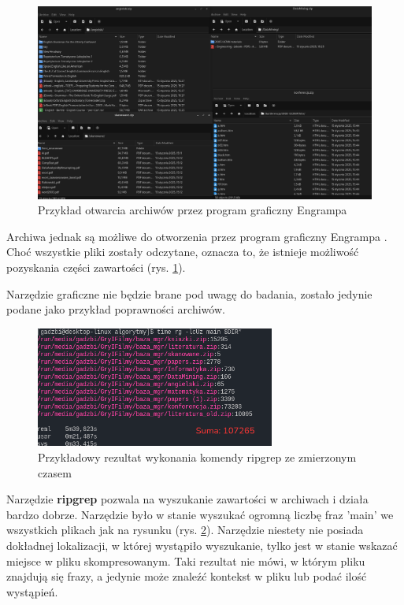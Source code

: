 \begin{figure}[htbp]
\centering
\includegraphics[width=1\textwidth]{./images/przykład-otwarcia-archiwów.png}
\caption{Przykład otwarcia archiwów przez program graficzny Engrampa}
\label{fig:engrampaExample}
\end{figure}

Archiwa jednak są możliwe do otworzenia przez program graficzny Engrampa \cite{bib:internet:EngrampaArchives}.
Choć wszystkie pliki zostały odczytane, oznacza to, że istnieje możliwość pozyskania
części zawartości (rys. \ref{fig:engrampaExample}).

Narzędzie graficzne nie będzie brane pod uwagę do badania, zostało jedynie podane
jako przykład poprawności archiwów.

\begin{figure}[htbp]
\centering
\includegraphics[width=0.7\textwidth]{./images/ripgrep-result-main.png}
\caption{Przykładowy rezultat wykonania komendy ripgrep ze zmierzonym czasem}
\label{fig:ripgrepResultMain}
\end{figure}

Narzędzie \textbf{ripgrep} pozwala na wyszukanie zawartości w archiwach i działa bardzo dobrze.
Narzędzie było w stanie wyszukać ogromną liczbę fraz 'main' we wszystkich plikach 
jak na rysunku (rys. \ref{fig:ripgrepResultMain}).
Narzędzie niestety nie posiada dokładnej lokalizacji, w której wystąpiło wyszukanie,
tylko jest w stanie wskazać miejsce w pliku skompresowanym.
Taki rezultat nie mówi, w którym pliku znajdują się frazy, a jedynie może znaleźć 
kontekst w pliku lub podać ilość wystąpień.

